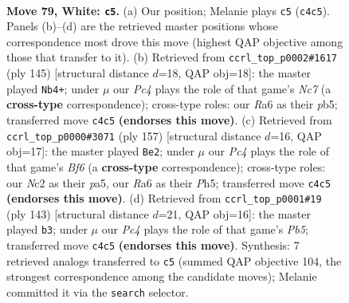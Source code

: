 \documentclass[11pt]{article}
\begin{document}
\clearpage

\begin{figure}[p]\centering
\begin{subfigure}{0.46\textwidth}\centering
\resizebox{\linewidth}{!}{%
\newchessgame
\chessboard[
  setfen={7k/1r4b1/R7/6R1/2P5/8/2N3K1/8 w - - 78 79},
  showmover=false,
  pgfstyle=straightmove, color=movearrow, markmove={c4-c5}
]}
\caption{}
\end{subfigure}\hfill
\begin{subfigure}{0.46\textwidth}\centering
\resizebox{\linewidth}{!}{%
\newchessgame
\chessboard[
  setfen={4R3/2r5/5k2/1P1K4/2B5/8/2n5/8 b - - 2 73},
  showmover=false,
  pgfstyle=straightmove, color=movearrow, markmove={c2-b4}
]}
\caption{}
\end{subfigure}
\\[4pt]
\begin{subfigure}{0.46\textwidth}\centering
\resizebox{\linewidth}{!}{%
\newchessgame
\chessboard[
  setfen={4k3/8/3Br3/P1K4p/7P/5b2/3R4/8 b - - 68 79},
  showmover=false,
  pgfstyle=straightmove, color=movearrow, markmove={f3-e2}
]}
\caption{}
\end{subfigure}\hfill
\begin{subfigure}{0.46\textwidth}\centering
\resizebox{\linewidth}{!}{%
\newchessgame
\chessboard[
  setfen={5rk1/R7/8/4KB2/1p6/8/8/8 b - - 1 72},
  showmover=false,
  pgfstyle=straightmove, color=movearrow, markmove={b4-b3}
]}
\caption{}
\end{subfigure}
\caption{\textbf{Move 79, White: \texttt{c5}.} (a) Our position; Melanie plays \texttt{c5} (\texttt{c4c5}). Panels (b)--(d) are the retrieved master positions whose correspondence most drove this move (highest QAP objective among those that transfer to it). (b) Retrieved from \texttt{ccrl\_top\_p0002\#1617} (ply 145) [structural distance $d$=18, QAP obj=18]: the master played \texttt{Nb4+}; under $\mu$ our \emph{Pc4} plays the role of that game's \emph{Nc7} (a \textbf{cross-type} correspondence); cross-type roles: our \emph{R}a6 as their \emph{p}b5; transferred move \texttt{c4c5} \textbf{(endorses this move)}. (c) Retrieved from \texttt{ccrl\_top\_p0000\#3071} (ply 157) [structural distance $d$=16, QAP obj=17]: the master played \texttt{Be2}; under $\mu$ our \emph{Pc4} plays the role of that game's \emph{Bf6} (a \textbf{cross-type} correspondence); cross-type roles: our \emph{N}c2 as their \emph{p}a5, our \emph{R}a6 as their \emph{P}h5; transferred move \texttt{c4c5} \textbf{(endorses this move)}. (d) Retrieved from \texttt{ccrl\_top\_p0001\#19} (ply 143) [structural distance $d$=21, QAP obj=16]: the master played \texttt{b3}; under $\mu$ our \emph{Pc4} plays the role of that game's \emph{Pb5}; transferred move \texttt{c4c5} \textbf{(endorses this move)}. Synthesis: 7 retrieved analogs transferred to \texttt{c5} (summed QAP objective 104, the strongest correspondence among the candidate moves); Melanie committed it via the \texttt{search} selector.}
\label{fig:thought-m156}
\end{figure}
\end{document}
